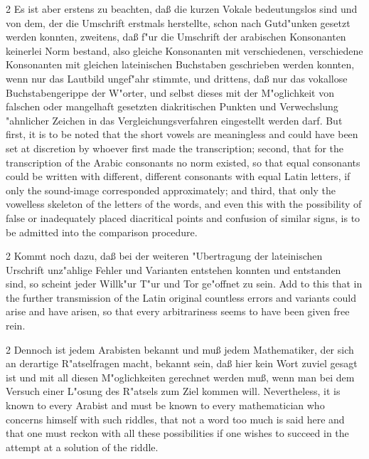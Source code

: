 \documentclass[10pt,a4paper]{article}
\renewcommand{\switchcolumn}{\syncronize\nointerlineskip\columnbreak}
\begin{document}
\begin{paracol}{2}
Es ist aber erstens zu beachten, da\ss{} die kurzen Vokale bedeutungslos sind und von dem, der die Umschrift erstmals herstellte, schon nach Gutd"unken gesetzt werden konnten, zweitens, da\ss{} f"ur die Umschrift der arabischen Konsonanten keinerlei Norm bestand, also gleiche Konsonanten mit verschiedenen, verschiedene Konsonanten mit gleichen lateinischen Buchstaben geschrieben werden konnten, wenn nur das Lautbild ungef"ahr stimmte, und drittens, da\ss{} nur das vokallose Buchstabengerippe der W"orter, und selbst dieses mit der M"oglichkeit von falschen oder mangelhaft gesetzten diakritischen Punkten und Verwechslung "ahnlicher Zeichen in das Vergleichungsverfahren eingestellt werden darf.
\switchcolumn
But first, it is to be noted that the short vowels are meaningless and could have been set at discretion by whoever first made the transcription; second, that for the transcription of the Arabic consonants no norm existed, so that equal consonants could be written with different, different consonants with equal Latin letters, if only the sound-image corresponded approximately; and third, that only the vowelless skeleton of the letters of the words, and even this with the possibility of false or inadequately placed diacritical points and confusion of similar signs, is to be admitted into the comparison procedure.
\end{paracol}

\begin{paracol}{2}
Kommt noch dazu, da\ss{} bei der weiteren "Ubertragung der lateinischen Urschrift unz"ahlige Fehler und Varianten entstehen konnten und entstanden sind, so scheint jeder Willk"ur T"ur und Tor ge"offnet zu sein.
\switchcolumn
Add to this that in the further transmission of the Latin original countless errors and variants could arise and have arisen, so that every arbitrariness seems to have been given free rein.
\end{paracol}

\begin{paracol}{2}
Dennoch ist jedem Arabisten bekannt und mu\ss{} jedem Mathematiker, der sich an derartige R"atselfragen macht, bekannt sein, da\ss{} hier kein Wort zuviel gesagt ist und mit all diesen M"oglichkeiten gerechnet werden mu\ss{}, wenn man bei dem Versuch einer L"osung des R"atsels zum Ziel kommen will.
\switchcolumn
Nevertheless, it is known to every Arabist and must be known to every mathematician who concerns himself with such riddles, that not a word too much is said here and that one must reckon with all these possibilities if one wishes to succeed in the attempt at a solution of the riddle.
\end{paracol}
\end{document}
